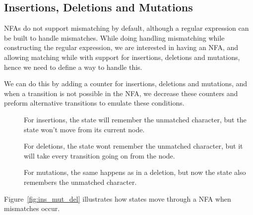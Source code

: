 

\newpage

\subsection{Insertions, Deletions and Mutations}
NFAs do not support mismatching by default, although a regular expression can be built to handle mismatches. While doing handling mismatching while constructing the regular expression, we are interested in having an NFA, and allowing matching while with support for insertions, deletions and mutations, hence we need to define a way to handle this.

We can do this by adding a counter for insertions, deletions and mutations, and when a transition is not possible in the NFA, we decrease these counters and preform alternative transitions to emulate these conditions.
\begin{description}
\item[] For insertions, the state will remember the unmatched character, but the state won't move from its current node.
\item[]For deletions, the state wont remember the unmatched character, but it will take every transition going on from the node.
\item[] For mutations, the same happens as in a deletion, but now the state also remembers the unmatched character.
\end{description}
Figure~\ref{fig:ins_mut_del} illustrates how states move through a NFA when mismatches occur. 

